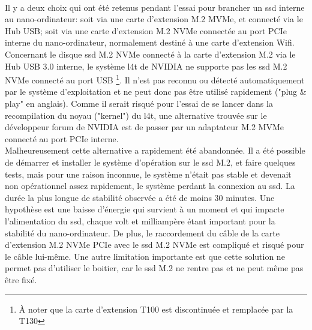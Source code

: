 \vspace{0.5\baselineskip}
\\
\noindent Il y a deux choix qui ont été retenus pendant l'essai pour brancher un \acrshort{ssd} interne au nano-ordinateur: soit via une carte d'extension M.2 MVMe, et connecté via le Hub USB; soit via une carte d'extension M.2 NVMe connectée au port PCIe interne du nano-ordinateur, normalement destiné à une carte d'extension Wifi.
\vspace{0.5\baselineskip}
\\
\noindent Concernant le disque \acrshort{ssd} M.2 NVMe connecté à la carte d'extension M.2 via le Hub USB 3.0 interne, le système \acrshort{l4t} de NVIDIA ne supporte pas les \acrshort{ssd} M.2 NVMe connecté au port USB \footnote{À noter que la carte d'extension T100 est discontinuée et remplacée par la T130}. Il n'est pas reconnu ou détecté automatiquement par le système d'exploitation et ne peut donc pas être utilisé rapidement ("plug \& play" en anglais). Comme il serait risqué pour l'essai de se lancer dans la recompilation du noyau ("kernel") du \acrshort{l4t}, une alternative trouvée sur le développeur forum de NVIDIA est de passer par un adaptateur M.2 MVMe connecté au port PCIe interne.
\vspace{0.5\baselineskip}
\\
\noindent Malheureusement cette alternative a rapidement été abandonnée. Il a été possible de démarrer et installer le système d'opération sur le \acrshort{ssd} M.2, et faire quelques tests, mais pour une raison inconnue, le système n'était pas stable et devenait non opérationnel assez rapidement, le système perdant la connexion au \acrshort{ssd}. La durée la plus longue de stabilité observée a été de moins 30 minutes. Une hypothèse est une baisse d'énergie qui survient à un moment et qui impacte l'alimentation du \acrshort{ssd}, chaque volt et milliampère étant important pour la stabilité du nano-ordinateur. De plus, le raccordement du câble de la carte d'extension M.2 NVMe PCIe avec le \acrshort{ssd} M.2 NVMe est compliqué et risqué pour le câble lui-même. Une autre limitation importante est que cette solution ne permet pas d'utiliser le boitier, car le \acrshort{ssd} M.2 ne rentre pas et ne peut même pas être fixé. 
